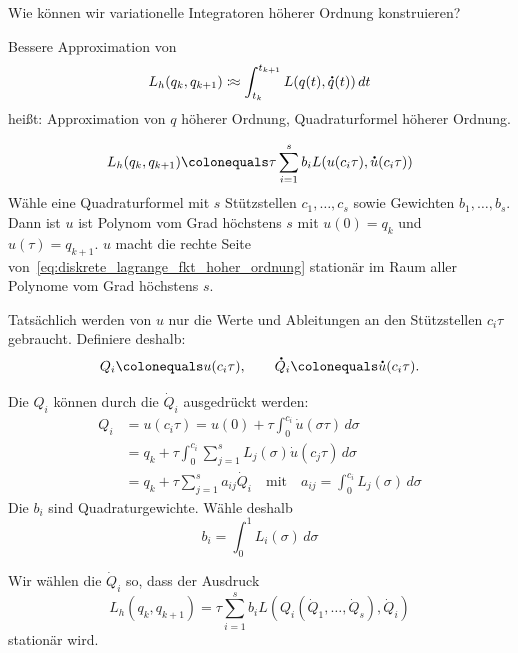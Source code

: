 Wie können wir variationelle Integratoren höherer Ordnung konstruieren?

Bessere Approximation von
\begin{equation*}
	L_h (q_k, q_{k+1})
	\colonapprox
	\int_{t_k}^{t_{k+1}} L(q(t),\dot{q}(t))\,dt
\end{equation*}
heißt: Approximation von $q$ höherer Ordnung, Quadraturformel höherer Ordnung.

\begin{idea}
	\begin{equation}
		\label{eq:diskrete_lagrange_fkt_hoher_ordnung}
		L_h (q_k, q_{k+1})
		\colonequals
		\tau \sum_{i=1}^s b_i L(u(c_i \tau), \dot{u}(c_i\tau))
	\end{equation}
	Wähle eine Quadraturformel mit $s$ Stützstellen $c_1, \dots, c_s$ sowie Gewichten $b_1, \dots,b_s$. Dann ist $u$ ist Polynom vom Grad höchstens $s$ mit
	$u(0) = q_k$ und $u(\tau) = q_{k+1}$. $u$ macht die rechte Seite von~\eqref{eq:diskrete_lagrange_fkt_hoher_ordnung} stationär im Raum aller Polynome vom Grad höchstens $s$.
\end{idea}

Tatsächlich werden von $u$ nur die Werte und Ableitungen an den Stützstellen $c_i \tau$ gebraucht. 
Definiere deshalb:
\begin{equation*}
	Q_i \colonequals u(c_i \tau), \quad\quad \dot{Q}_i \colonequals \dot{u}(c_i \tau).
\end{equation*}

Die $Q_i$ können durch die $\dot{Q}_i$ ausgedrückt werden:
\begin{align}
	\nonumber
	Q_i &= u(c_i \tau) = u(0) + \tau \int_0^{c_i} \dot{u}(\sigma\tau)\, d\sigma\\
	\nonumber
	&=
	q_k + \tau\int_0^{c_i}\sum_{j=1}^s L_j(\sigma)\dot{u}(c_j\tau)\,d\sigma \tag{Lagrange--Darstellung}\\
	\label{eq:vi_darstellung_der_Q}
	&= q_k + \tau\sum_{j=1}^s a_{ij}\dot{Q}_i \quad \text{mit}\quad a_{ij} = \int_0^{c_i} L_j(\sigma)\,d\sigma
\end{align}
Die $b_i$ sind Quadraturgewichte.  Wähle deshalb
\begin{equation*}
	b_i = \int_0^1 L_i(\sigma)\,d\sigma
\end{equation*}

Wir wählen die $\dot{Q}_i$ so, dass der Ausdruck
\begin{equation*}
	L_h(q_k, q_{k+1}) = \tau\sum_{i=1}^s b_iL(Q_i(\dot{Q}_1,\dots,\dot{Q}_s),\dot{Q}_i)
\end{equation*}
stationär wird.

